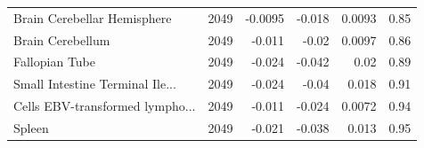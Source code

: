 \documentclass{article}
\begin{document}
\begin{table}[h!]
\begin{tabular}{lrrrrr}
  Brain Cerebellar Hemisphere & 2049 & -0.0095 & -0.018 & 0.0093 & 0.85 \\ 
  Brain Cerebellum & 2049 & -0.011 & -0.02 & 0.0097 & 0.86 \\ 
  Fallopian Tube & 2049 & -0.024 & -0.042 & 0.02 & 0.89 \\ 
  Small Intestine Terminal Ile... & 2049 & -0.024 & -0.04 & 0.018 & 0.91 \\ 
  Cells EBV-transformed lympho... & 2049 & -0.011 & -0.024 & 0.0072 & 0.94 \\ 
  Spleen & 2049 & -0.021 & -0.038 & 0.013 & 0.95 \\ 
   \hline
\end{tabular}
\end{table}

\begin{table}[h!]
\renewcommand{\thetable}{S\arabic{table}}
\centering
\caption{Prediciton results for 74,000 top independent loci in each method}
\end{table}
\end{document}

